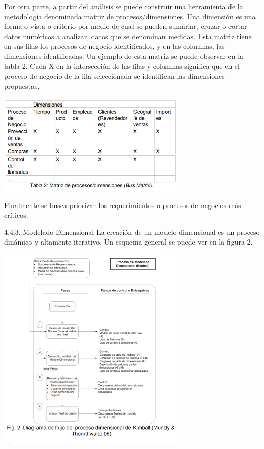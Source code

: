 \documentclass[%
 reprint,
 amsmath,amssymb,
 aps,
]{revtex4-1}
\begin{document}
Por otra parte, a partir del análisis se puede construir una herramienta de la metodología denominada matriz de procesos/dimensiones.
Una dimensión es una forma o vista o criterio por medio de cual se pueden sumariar, cruzar o cortar datos numéricos a analizar, datos que se denominan medidas.
Esta matriz tiene en sus filas los procesos de negocio identificados,
y en las columnas, las dimensiones identificadas.
Un ejemplo de esta matriz se puede observar en la tabla 2. Cada X en la intersección de las filas y columnas significa que en el proceso de negocio de la fila seleccionada se identifican las dimensiones propuestas. 
                 \begin{center}
					\includegraphics[width=9cm]{./IMAGENES/img03}
				\end{center}
Finalmente se busca priorizar los requerimientos o procesos de negocios más críticos. 

4.4.3. Modelado Dimensional
La creación de un modelo dimensional es un proceso dinámico y altamente iterativo. Un esquema general se puede ver en la figura 2. 
\begin{center}
	\includegraphics[width=9cm]{./IMAGENES/img04}
\end{center}
\end{document}
